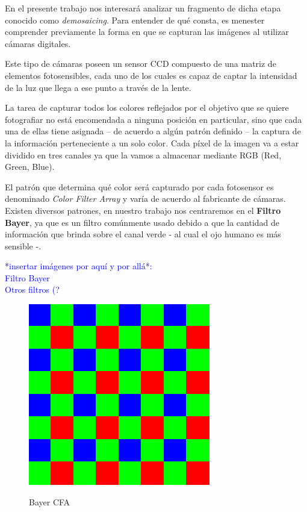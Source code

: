 \documentclass[a4paper]{article}
\begin{document}
En el presente trabajo nos interesará analizar un fragmento de dicha etapa conocido como \emph{demosaicing}. Para entender de qué consta, es menester comprender previamente la forma en que se capturan las imágenes al utilizar cámaras digitales.

Este tipo de cámaras poseen un sensor CCD compuesto de una matriz de elementos fotosensibles, cada uno de los cuales es capaz de captar la intensidad de la luz que llega a ese punto a través de la lente. 

La tarea de capturar todos los colores reflejados por el objetivo que se quiere fotografiar no está encomendada a ninguna posición en particular, sino que cada una de ellas tiene asignada – de acuerdo a algún patrón definido  – la captura de la información perteneciente a un solo color. Cada p\'ixel de la imagen va a estar dividido en tres canales ya que la vamos a almacenar mediante RGB (Red, Green, Blue).

El patr\'on que determina qué color será capturado por cada fotosensor es denominado \emph{Color Filter Array} y var\'ia de acuerdo al fabricante de c\'amaras. Existen diversos patrones, en nuestro trabajo nos centraremos en el \textbf{Filtro Bayer}, ya que es un filtro com\'unmente usado debido a que la cantidad de informaci\'on que brinda sobre el canal verde - al cual el ojo humano es más sensible -.

\textcolor{blue}{*insertar imágenes por aquí y por allá*:\\
Filtro Bayer \\
Otros filtros (?
}

\begin{figure}[h!]
	\caption{Bayer CFA}
	\begin{center}
	\includegraphics[scale=0.36]{imagenes/BayerFilter}
	\label{Bayer}
  \end{center}
\end{figure}
\end{document}
